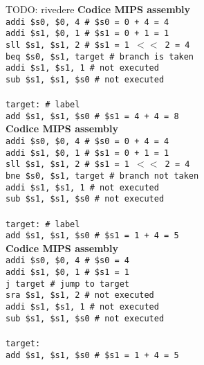 \documentclass[../main.tex]{subfiles}
\begin{document}
\noindent
TODO: rivedere
\noindent
\textbf{Codice MIPS assembly} \\
\texttt{addi \$s0, \$0, 4           \# \$s0 = 0 + 4 = 4} \\
\texttt{addi \$s1, \$0, 1           \# \$s1 = 0 + 1 = 1} \\
\texttt{sll \$s1, \$s1, 2           \# \$s1 = 1 $<<$ 2 = 4} \\
\texttt{beq \$s0, \$s1, target      \# branch is taken} \\
\texttt{addi \$s1, \$s1, 1          \# not executed} \\
\texttt{sub \$s1, \$s1, \$s0        \# not executed} \\
\\
\texttt{target:                     \# label} \\
\texttt{add \$s1, \$s1, \$s0        \# \$s1 = 4 + 4 = 8} \\

\noindent
\textbf{Codice MIPS assembly} \\
\texttt{addi \$s0, \$0, 4           \# \$s0 = 0 + 4 = 4} \\
\texttt{addi \$s1, \$0, 1           \# \$s1 = 0 + 1 = 1} \\
\texttt{sll \$s1, \$s1, 2           \# \$s1 = 1 $<<$ 2 = 4} \\
\texttt{bne \$s0, \$s1, target      \# branch not taken} \\
\texttt{addi \$s1, \$s1, 1          \# not executed} \\
\texttt{sub \$s1, \$s1, \$s0        \# not executed} \\
\\
\texttt{target:                     \# label} \\
\texttt{add \$s1, \$s1, \$s0        \# \$s1 = 1 + 4 = 5} \\

\noindent
\textbf{Codice MIPS assembly} \\
\texttt{addi \$s0, \$0, 4           \# \$s0 = 4} \\
\texttt{addi \$s1, \$0, 1           \# \$s1 = 1} \\
\texttt{j target                    \# jump to target} \\
\texttt{sra \$s1, \$s1, 2           \# not executed} \\
\texttt{addi \$s1, \$s1, 1          \# not executed} \\
\texttt{sub \$s1, \$s1, \$s0        \# not executed} \\
\\
\texttt{target:} \\
\texttt{add \$s1, \$s1, \$s0        \# \$s1 = 1 + 4 = 5} \\
\end{document}
